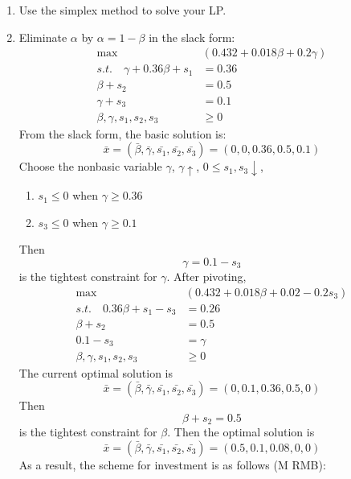 \documentclass[12pt,a4paper]{article}
\makeatletter
\newtheorem*{solution}{Solution}
\theoremstyle{definition}
\renewenvironment{solution}[1][Solution] {\par\pushQED{\qed}\normalfont\topsep6\p@\@plus6\p@\relax\trivlist\item[\hskip\labelsep\bfseries#1\@addpunct{.}]\ignorespaces}{\popQED\endtrivlist\@endpefalse} \makeatother
\makeatother
\begin{document}
\begin{enumerate}
\begin{enumerate}
    \item
    Use the simplex method to solve your LP.
    \begin{solution}
      Eliminate $\alpha$ by $\alpha = 1-\beta$ in the slack form:
      \begin{align*}
        \max &(0.432+0.018\beta+0.2\gamma)\\
        s.t.\quad \gamma +0.36\beta+s_1&= 0.36\\
        \beta +s_2&= 0.5\\
        \gamma +s_3 &= 0.1\\
        \beta,\gamma,s_1,s_2,s_3&\geq 0
      \end{align*}
      From the slack form, the basic solution is:
      \begin{equation*}
        \bar{x} = (\bar{\beta},\bar{\gamma},\bar{s_1},\bar{s_2},\bar{s_3})=(0,0,0.36,0.5,0.1)
      \end{equation*}
      Choose the nonbasic variable $\gamma$, $\gamma\uparrow$, $0\leq s_1,s_3 \downarrow$, 
      \begin{enumerate}
        \item $s_1\leq 0$ when $\gamma\geq 0.36$
        \item $s_3\leq 0$ when $\gamma\geq 0.1$
      \end{enumerate}
      Then
      \begin{equation*}
        \gamma = 0.1-s_3
      \end{equation*}
      is the tightest constraint for $\gamma$. After pivoting,
      \begin{align*}
        \max &(0.432+0.018\beta+0.02-0.2s_3)\\
        s.t.\quad 0.36\beta+s_1-s_3&= 0.26\\
        \beta +s_2&= 0.5\\
        0.1-s_3 &=\gamma\\
        \beta,\gamma,s_1,s_2,s_3&\geq 0
      \end{align*}
      The current optimal solution is
      \begin{equation*}
        \bar{x} = (\bar{\beta},\bar{\gamma},\bar{s_1},\bar{s_2},\bar{s_3})=(0,0.1,0.36,0.5,0)
      \end{equation*}
      Then
      \begin{equation*}
        \beta +s_2= 0.5
      \end{equation*}
      is the tightest constraint for $\beta$. Then the optimal solution is \begin{equation*}
        \bar{x} = (\bar{\beta},\bar{\gamma},\bar{s_1},\bar{s_2},\bar{s_3})=(0.5,0.1,0.08,0,0)
      \end{equation*}
      As a result, the scheme for investment is as follows (M RMB):


\end{solution}
\end{enumerate}
\end{enumerate}
\end{document}
